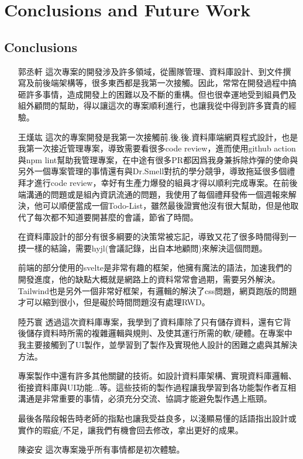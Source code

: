 \documentclass[a4paper, 12pt]{article}
\begin{document}
\newpage

\section{Conclusions and Future Work}
\subsection{Conclusions}
\begin{itemize}
    \item[郭丞軒] 
    這次專案的開發涉及許多領域，從團隊管理、資料庫設計、到文件撰寫及前後端架構等，很多東西都是我第一次接觸。因此，常常在開發過程中搞砸許多事情，造成開發上的困難以及不斷的重構。但也很幸運地受到組員們及組外顧問的幫助，得以讓這次的專案順利進行，也讓我從中得到許多寶貴的經驗。
    \item[王熯竑] 
    這次的專案開發是我第一次接觸前.後.後.資料庫端網頁程式設計，也是我第一次接近管理專案，導致需要看很多code review，進而使用github action與npm lint幫助我管理專案，在中途有很多PR都因爲我身兼拆除炸彈的使命與另外一個專案管理的事情還有與Dr.Smell對抗的學分競爭，導致拖延很多個禮拜才進行code review，幸好有生產力爆發的組員才得以順利完成專案。在前後端溝通的問題或是組內資訊流通的問題，我使用了每個禮拜發佈一個週報來解決，他可以順便當成一個Todo-List，雖然最後證實他沒有很大幫助，但是他取代了每次都不知道要開甚麼的會議，節省了時間。
    
    在資料庫設計的部分有很多綱要的決策常被忘記，導致又花了很多時間得到一摸一樣的結論，需要hyjl(會議記錄，出自本地顧問)來解決這個問題。

    前端的部分使用的svelte是非常有趣的框架，他擁有魔法的語法，加速我們的開發進度，他的缺點大概就是網路上的資料常常會過期，需要另外解決。Tailwind也是另外一個非常好框架，有邏輯的解決了css問題，網頁跑版的問題才可以縮到很小，但是礙於時間問題沒有處理RWD。
    \item[陸艿寰] 
    透過這次資料庫專案，我學到了資料庫除了只有儲存資料，還有它背後儲存資料時所需的複雜邏輯與規則、及使其運行所需的軟/硬體。在專案中我主要接觸到了UI製作，並學習到了製作及實現他人設計的困難之處與其解決方法。

    專案製作中還有許多其他關鍵的技術。如設計資料庫架構、實現資料庫邏輯、銜接資料庫與UI功能...等。這些技術的製作過程讓我學習到各功能製作者互相溝通是非常重要的事情，必須充分交流、協調才能避免製作遇上瓶頸。

    最後各階段報告時老師的指點也讓我受益良多，以淺顯易懂的話語指出設計或實作的瑕疵/不足，讓我們有機會回去修改，拿出更好的成果。
    \item[陳姿安] 
    這次專案幾乎所有事情都是初次體驗。


\end{itemize}
\end{document}
